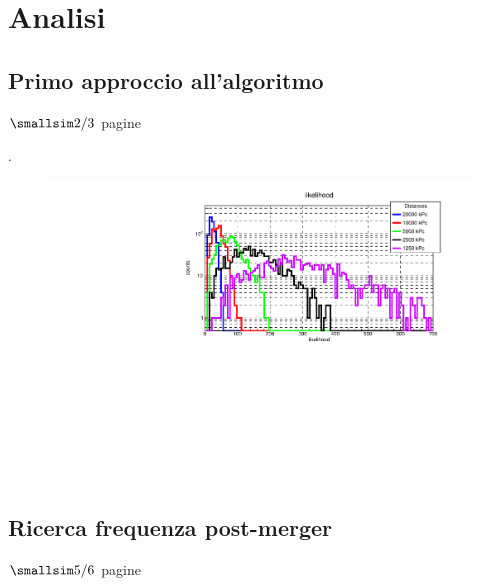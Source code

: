 \chapter{Analisi}
\label{chapter:analisi}
\section{Primo approccio all'algoritmo}
\label{section:analisiSimSingole}
\begin{center}
	$\smallsim 2/3$ pagine
\end{center}

\lipsum[7]\cite{hartle2003gravity}.

\begin{center}
	\begin{figure}[H]
		\centering
		\includegraphics[scale=0.8, angle=0]{figures/Capitolo_4/likelihoodDistribution.pdf}
		\setlength{\belowcaptionskip}{-20pt}
		\caption{}
		\label{fig:likelihoodDistribution}
	\end{figure}
\end{center}	

\section{Ricerca frequenza post-merger}
\begin{center}
	$\smallsim 5/6$ pagine
\end{center}

